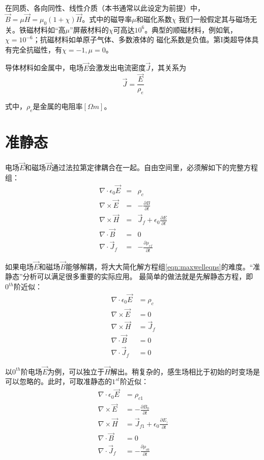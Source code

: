 在同质、各向同性、线性介质（本书通常以此设定为前提）中，$\vec{B}=\mu \vec{H}=\mu_0(1+\chi)\vec{H}$。式中的磁导率$\mu$和磁化系数$\chi$
我们一般假定其与磁场无关。铁磁材料如“高$\mu$”屏蔽材料的$\chi$可高达$10^6$。典型的顺磁材料，例如氧，$\chi=10^{-6}$；抗磁材料如单原子气体、多数液体的
磁化系数是负值。第I类超导体具有完全抗磁性，有$\chi=-1, \mu=0$。

导体材料如金属中，电场$\vec{E}$会激发出电流密度$\vec{J}$，其关系为
\begin{equation}\label{eqn:ohmlaw}
  \vec{J}=\frac{\vec{E}}{\rho_e}
\end{equation}

式中，$\rho_e$是金属的电阻率$[\Omega m]$。

\section{准静态}
电场$\vec{E}$和磁场$\vec{B}$通过法拉第定律耦合在一起。自由空间里，必须解如下的完整方程组：
\begin{eqnarray}\label{eqn:maxwelleqns}
\nabla \cdot \epsilon_0\vec{E} &=&\rho_c \nonumber \\
\nabla \times \vec{E} &=&-\frac{\partial{B}}{\partial{t}} \nonumber \\
\nabla \times \vec{H} &=&\vec{J}_f+\epsilon_0 \frac{\partial{E}}{\partial{t}} \nonumber \\
\nabla \cdot \vec{B} &=&0 \nonumber \\
\nabla \cdot \vec{J}_f &=&-\frac{\partial{\rho_{cf}}}{\partial{t}}
\end{eqnarray}

如果电场$\vec{E}$和磁场$\vec{B}$能够解耦，将大大简化解方程组\ref{eqn:maxwelleqns}的难度。“准静态”分析可以满足很多重要的实际应用。
最简单的做法就是先解静态方程，即$0^{th}$阶近似：
\begin{subequations}\label{eqn:maxwelleqns 0th}
	\begin{align}
\nabla \cdot \epsilon_0\vec{E} &=\rho_c \\
\nabla \times \vec{E} &=0  \\
\nabla \times \vec{H} &=\vec{J}_f  \\
\nabla \cdot \vec{B} &=0  \\
\nabla \cdot \vec{J}_f &=0
	\end{align}
\end{subequations}

以$0^{th}$阶电场$\vec{E}$为例，可以独立于$\vec{H}$解出。稍复杂的，感生场相比于初始的时变场是可以忽略的。此时，可取准静态的$1^{st}$阶近似：
\begin{subequations}\label{eqn:maxwelleqns 1th}
	\begin{align}
\nabla \cdot \epsilon_0\vec{E} &=\rho_{c1} \\
\nabla \times \vec{E} &=-\frac{\partial{B_0}}{\partial{t}} \\
\nabla \times \vec{H} &=\vec{J}_{f1}+\epsilon_0 \frac{\partial{E_)}}{\partial{t}}  \\
\nabla \cdot \vec{B} &=0 \\
\nabla \cdot \vec{J}_f &=-\frac{\partial{\rho_{c0}}}{\partial{t}}
	\end{align}
\end{subequations}

